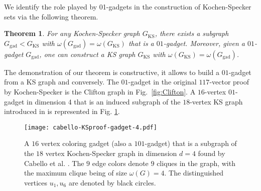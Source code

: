 \documentclass[twocolumn, a4paper, superscriptaddress,nofootinbib, accepted=2020-08-07, hyperref]{quantumarticle}
\newtheorem{theorem}{Theorem}
\begin{document}
We identify the role played by 01-gadgets in the construction of Kochen-Specker sets via the following theorem. 
\begin{theorem}
	\label{prop:KS-gadg}
	For any Kochen-Specker graph $G_\text{KS}$, there exists a subgraph $G_{\text{gad}}<G_{\text{KS}}$ with $\omega(G_\text{gad})=\omega(G_\text{KS})$ that is a $01$-gadget. Moreover, given a $01$-gadget $G_{\text{gad}}$, one can construct a KS graph $G_\text{KS}$ with $\omega(G_\text{KS})=	\omega(G_{\text{gad}})$. 
\end{theorem} 
The demonstration of our theorem is constructive, it allows to build a $01$-gadget from a KS graph and conversely.
The $01$-gadget in the original $117$-vector proof by Kochen-Specker is the Clifton graph in Fig.~\ref{fig:Clifton}.
A $16$-vertex $01$-gadget in dimension 4 that is an induced subgraph of the $18$-vertex KS graph introduced in \cite{CEG96} is represented in Fig. \ref{fig:cab-KS-gadget}.
\begin{figure}[t]
	\centerline{\texttt{[image: cabello-KSproof-gadget-4.pdf]}}
	\caption{A $16$ vertex coloring gadget (also a $101$-gadget) that is a subgraph of the $18$ vertex Kochen-Specker graph in dimension $d=4$ found by Cabello et al. \cite{CEG96}. The $9$ edge colors denote $9$ cliques in the graph, with the maximum clique being of size $\omega(G) = 4$. The distinguished vertices $u_1, u_6$ are denoted by black circles.}
	\label{fig:cab-KS-gadget}
\end{figure} 
\end{document}
